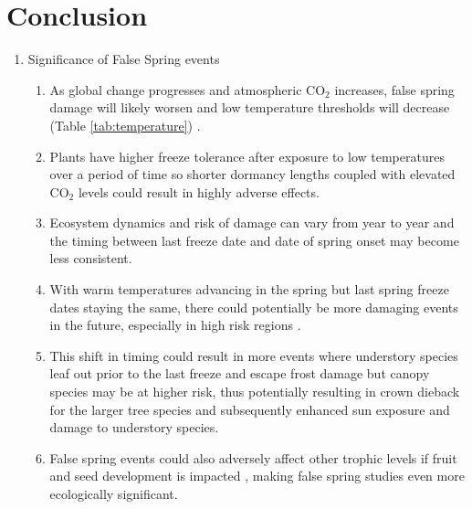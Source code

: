 \documentclass{article}\usepackage[]{graphicx}\usepackage[]{color}
\begin{document}
\section*{Conclusion}
\begin{enumerate}
\item Significance of False Spring events
\begin{enumerate}
\item As global change progresses and atmospheric CO$_{\text{2}}$ increases, false spring damage will likely worsen and low temperature thresholds will decrease (Table \ref{tab:temperature}) \citep{Beerling2001, Barker2005}.
\item Plants have higher freeze tolerance after exposure to low temperatures over a period of time \citep{Thomashow1999} so shorter dormancy lengths coupled with elevated CO$_{\text{2}}$ levels could result in highly adverse effects. 
\item Ecosystem dynamics and risk of damage can vary from year to year and the timing between last freeze date and date of spring onset may become less consistent. 
\item With warm temperatures advancing in the spring but last spring freeze dates staying the same, there could potentially be more damaging events in the future, especially in high risk regions \citep{Gu2008, Inouye2008}.
\item This shift in timing could result in more events where understory species leaf out prior to the last freeze and escape frost damage but canopy species may be at higher risk, thus potentially resulting in crown dieback for the larger tree species and subsequently enhanced sun exposure and damage to understory species.
\item False spring events could also adversely affect other trophic levels if fruit and seed development is impacted \citep{Gu2008}, making false spring studies even more ecologically significant.
\end{enumerate}


\end{enumerate}
\end{document}
